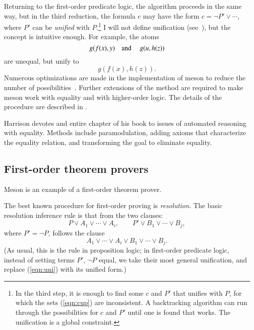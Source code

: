 \documentclass{llncs}
\begin{document}
Returning to the first-order predicate logic, the algorithm proceeds
in the same way, but in the third reduction, the formula $c$ may have
the form $c=\lnot P' \lor \cdots$, where $P'$ can be {\it unified}
with $P$.\footnote{In the third step, it is enough to find some $c$
  and $P'$ that unifies with $P$, for which the sets (\ref{eqn:cup})
  are inconsistent.  A backtracking algorithm can run through the
  possibilities for $c$ and $P'$ until one is found that works.  The
  unification is a global constraint.}  I will not define unification
(see~\cite{Ha09}), but the concept is intuitive enough.  For
example, the atoms
\[
g(f(x),y) \text{\quad and \quad} g(u,h(z))
\]
are unequal, but unify to
\[
g(f(x),h(z)).
\]
Numerous optimizations are made in the implementation of meson to
reduce the number of possibilities~\cite{harrison:meson}.  
Further extensions of the method are required to make meson work with
equality and with higher-order logic.  
The details of the 
procedure are described in \cite[Sec.~3.15]{Ha09}.

Harrison devotes and entire chapter
of his book to issues of automated reasoning with equality.
Methods include paramodulation, adding axioms that characterize the equality
relation, and transforming the goal to eliminate equality.


\subsection{First-order theorem provers}

Meson is an example of a first-order theorem prover.   

The best known procedure for first-order proving is {\it resolution}.
The basic resolution inference rule is that from the two clauses:
\[
P \lor A_1 \lor \cdots \lor A_i,\qquad P' \lor B_1 \lor \cdots\lor B_j,
\]
where $P' = \lnot P$,
follows the clause
\begin{equation}\label{eqn:uni}
A_1\lor \cdots \lor A_i \lor B_1 \lor \cdots \lor B_j.
\end{equation}
(As usual, this is the rule in proposition logic; in first-order
predicate logic, instead of setting terms $P'$, $\lnot P$ equal,
we take their most general unification,  and
replace (\ref{eqn:uni}) with its unified form.)
\end{document}
